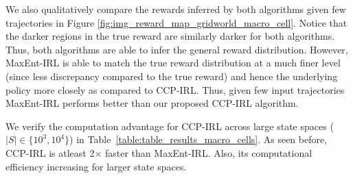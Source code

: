 \documentclass{article}
\begin{document}
We also qualitatively compare the rewards inferred by both algorithms given few trajectories in 
Figure \ref{fig:img_reward_map_gridworld_macro_cell}. Notice that the darker regions in the true reward are similarly darker for both algorithms. Thus, both algorithms are able to infer the general reward distribution. However, MaxEnt-IRL is able to match the true reward distribution at a much finer level (since less discrepancy compared to the true reward) and hence the underlying policy more closely as compared to CCP-IRL.
Thus, given few input trajectories MaxEnt-IRL performs better than our proposed CCP-IRL algorithm.


We verify the computation advantage for CCP-IRL across large state spaces ($|S| \in \{10^3, 10^4\}$) in Table~\ref{table:table_results_macro_cells}. As seen before, CCP-IRL is atleast 2$\times$ faster than MaxEnt-IRL. Also, its computational efficiency increasing for larger state spaces.

\end{document}
